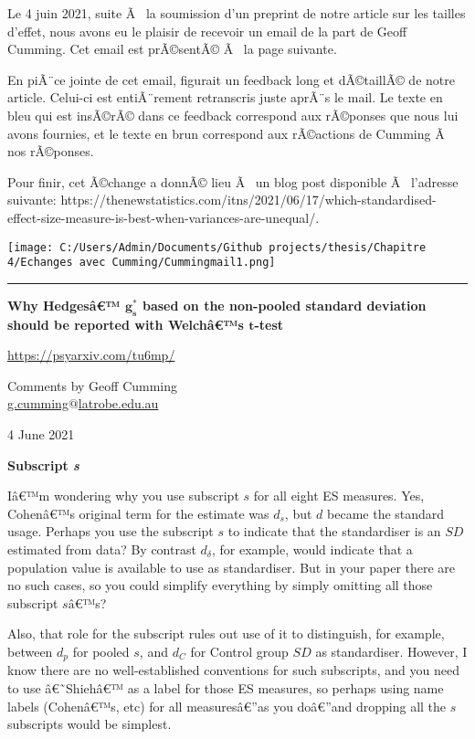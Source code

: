 \begin{appendix}
Le 4 juin 2021, suite Ã~ la soumission d'un preprint de notre article
sur les tailles d'effet, nous avons eu le plaisir de recevoir un email
de la part de Geoff Cumming. Cet email est prÃ©sentÃ© Ã~ la page
suivante.

En piÃ¨ce jointe de cet email, figurait un feedback long et dÃ©taillÃ©
de notre article. Celui-ci est entiÃ¨rement retranscris juste aprÃ¨s le
mail. Le texte en bleu qui est insÃ©rÃ© dans ce feedback correspond aux
rÃ©ponses que nous lui avons fournies, et le texte en brun correspond
aux rÃ©actions de Cumming Ã~ nos rÃ©ponses.

Pour finir, cet Ã©change a donnÃ© lieu Ã~ un blog post disponible Ã~
l'adresse suivante:
https://thenewstatistics.com/itns/2021/06/17/which-standardised-effect-size-measure-is-best-when-variances-are-unequal/.

\texttt{[image: C:/Users/Admin/Documents/Github projects/thesis/Chapitre 4/Echanges avec Cumming/Cummingmail1.png]}
\newpage

\begin{center}\rule{0.5\linewidth}{0.5pt}\end{center}

\color{black}\textbf{Why Hedgesâ€™ \(\bm{g_s^*}\) based on the
non-pooled standard deviation should be reported with Welchâ€™s
\(\bm{t}\)-test}

\underline{https://psyarxiv.com/tu6mp/}

Comments by Geoff Cumming\\
\underline{g.cumming$@$latrobe.edu.au}

4 June 2021

\textbf{Subscript \emph{s}}

Iâ€™m wondering why you use subscript \(s\) for all eight ES measures.
Yes, Cohenâ€™s original term for the estimate was \(d_s\), but \(d\)
became the standard usage. Perhaps you use the subscript \(s\) to
indicate that the standardiser is an \(SD\) estimated from data? By
contrast \(d_\delta\), for example, would indicate that a population
value is available to use as standardiser. But in your paper there are
no such cases, so you could simplify everything by simply omitting all
those subscript \(sâ€™\)s?

Also, that role for the subscript rules out use of it to distinguish,
for example, between \(d_p\) for pooled \(s\), and \(d_C\) for Control
group \(SD\) as standardiser. However, I know there are no
well-established conventions for such subscripts, and you need to use
â€˜Shiehâ€™ as a label for those ES measures, so perhaps using name
labels (Cohenâ€™s, etc) for all measuresâ€''as you doâ€''and dropping
all the \(s\) subscripts would be simplest.


\end{appendix}
